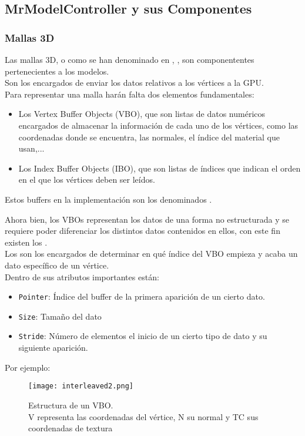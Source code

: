 \subsection{MrModelController y sus Componentes}
\subsubsection{Mallas 3D}
Las mallas 3D, o como se han denominado en \robotto, \rorefmesh, son componententes pertenecientes a los modelos.\\
Son los encargados de enviar los datos relativos a los vértices a la GPU.\\
Para representar una malla harán falta dos elementos fundamentales:

\begin{itemize}
\item Los Vertex Buffer Objects (VBO), que son listas de datos numéricos encargados de almacenar la información de cada uno de los vértices, como las coordenadas donde se encuentra, las normales, el índice del material que usan,...
\item Los Index Buffer Objects (IBO), que son listas de índices que indican el orden en el que los vértices deben ser leídos.
\end{itemize}

Estos buffers en la implementación son los denominados \rorefbuffer.

Ahora bien, los VBOs representan los datos de una forma no estructurada y se requiere poder diferenciar los distintos datos contenidos en ellos, con este fin existen los \rorefbufferkey.\\
Los \rorefbufferkey son los encargados de determinar en qué índice del VBO empieza y acaba un dato específico de un vértice.\\
Dentro de sus atributos importantes están:
\begin{itemize}
\item \texttt{Pointer}: Índice del buffer de la primera aparición de un cierto dato.
\item \texttt{Size}: Tamaño del dato
\item \texttt{Stride}: Número de elementos el inicio de un cierto tipo de dato y su siguiente aparición.
\end{itemize}

Por ejemplo:\\
\begin{figure}[h!]
\begin{center}
\texttt{[image: interleaved2.png]}
\end{center}
\caption[Estructura de un VBO]{Estructura de un VBO.\\ V representa las coordenadas del vértice, N su normal y TC sus coordenadas de textura}
\label{interleaved2}
\end{figure}

